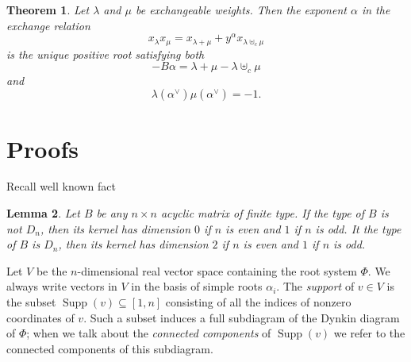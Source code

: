 \documentclass[11pt]{amsart}
\newcommand{\Supp}{\operatorname{Supp}}
\newtheorem{theorem}{Theorem}[section]
\newtheorem{lemma}[theorem]{Lemma}
\numberwithin{equation}{section}
\begin{document}
\begin{theorem}
  Let $\lambda$ and $\mu$ be exchangeable weights. 
  Then the exponent $\alpha$ in the exchange relation
  \[
    x_\lambda x_\mu = x_{\lambda+\mu} + y^\alpha x_{\lambda\uplus_c\mu}
  \]
  is the unique positive root satisfying both
  \[
    -B\alpha = \lambda+\mu-\lambda\uplus_c\mu
  \]
  and
  \[
    \lambda(\alpha^\vee)  \mu(\alpha^\vee) = -1.
  \]
\end{theorem}

\section{Proofs}

Recall well known fact
\begin{lemma}
  Let $B$ be any $n\times n$ acyclic matrix of finite type.
  If the type of $B$ is not $D_n$, then its kernel has dimension $0$ if $n$ is even and $1$ if $n$ is odd.
  It the type of $B$ is $D_n$, then its kernel has dimension $2$ if $n$ is even and $1$ if $n$ is odd.
\end{lemma}

Let $V$ be the $n$-dimensional real vector space containing the root system $\Phi$.
We always write vectors in $V$ in the basis of simple roots $\alpha_i$.
The \emph{support} of $v\in V$ is the subset $\Supp(v)\subseteq [1,n]$ consisting of all the indices of nonzero coordinates of $v$.
Such a subset induces a full subdiagram of the Dynkin diagram of $\Phi$; when we talk about the \emph{connected components} of $\Supp(v)$ we refer to the connected components of this subdiagram.



\end{document}
